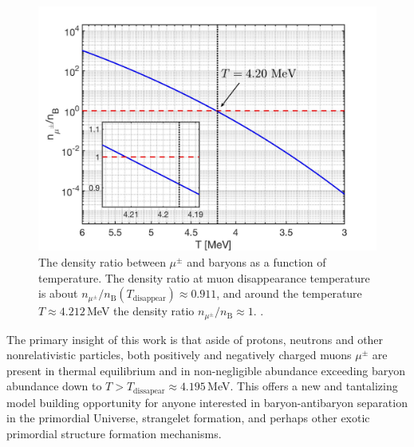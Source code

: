 \begin{figure}
\centerline{\includegraphics[width=0.9\linewidth]{./plots/DensityRatio_new2.jpg}}
\caption{The density ratio between $\mu^\pm$ and baryons as a function of temperature. The density ratio at muon disappearance temperature is about $n_{\mu^\pm}/n_\mathrm{B}(T_\mathrm{disappear})\approx0.911$, and around the temperature $T\approx4.212$\,MeV the density ratio $n_{\mu^\pm}/n_\mathrm{B}\approx1$. . }
\label{fig:DensityRatio}
\end{figure}

The primary insight of this work is that aside of protons, neutrons and other nonrelativistic particles, both positively and negatively charged muons $\mu^\pm$ are present in thermal equilibrium and in non-negligible abundance exceeding baryon abundance down to  $T>T_\mathrm{dissapear}\approx 4.195$\,MeV. This offers a new and tantalizing model building opportunity for anyone interested in baryon-antibaryon separation in the primordial Universe, strangelet formation, and perhaps other exotic primordial structure formation mechanisms. 

